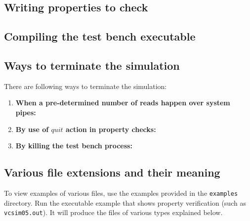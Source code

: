 \documentclass[12pt,a4paper]{article}
\begin{document}
\subsection{Writing properties to check}

\subsection{Compiling the test bench executable}

\subsection{Ways to terminate the simulation}

There are following ways to terminate the simulation:

\begin{enumerate}
\item \textbf{When a pre-determined number of reads happen over system pipes:}
\item \textbf{By use of $quit$ action in property checks:}
\item \textbf{By killing the test bench process:}
\end{enumerate}

\subsection{Various file extensions and their meaning}

To view examples of various files, use the examples provided in the \texttt{examples} directory. Run the executable example that shows property verification (such as \texttt{vcsim05.out}). It will produce the files of various types explained below.
\end{document}
